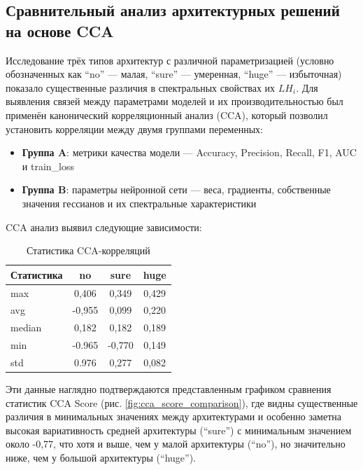 \documentclass[a4paper,12pt]{article}
\begin{document}
\subsection{Сравнительный анализ архитектурных решений на основе CCA}

Исследование трёх типов архитектур с различной параметризацией (условно обозначенных как ``no'' --- малая,
``sure'' --- умеренная, ``huge'' --- избыточная) показало существенные различия в спектральных свойствах их
$LH_i$. Для выявления связей между параметрами моделей и их производительностью был применён
канонический корреляционный анализ (CCA), который позволил установить корреляции между двумя группами переменных:

\begin{itemize}
  \item \textbf{Группа A}: метрики качества модели --- Accuracy, Precision, Recall, F1, AUC и train\_loss
  \item \textbf{Группа B}: параметры нейронной сети --- веса, градиенты, собственные значения гессианов и их
    спектральные характеристики
\end{itemize}

CCA анализ выявил следующие зависимости:

\begin{table}[ht]
  \centering
  \label{tab:cca_max}
  \begin{tabular}{|l|c|c|c|}
    \hline
    \textbf{Статистика} & \textbf{no} & \textbf{sure} & \textbf{huge} \\
    \hline
    max & 0,406 & 0,349 & 0,429 \\
    avg & -0,955 & 0,099 & 0,220 \\
    median & 0,182 & 0,182 & 0,189 \\
    min & -0.965 & -0,770 & 0,149 \\
    std & 0.976 & 0,277 & 0,082 \\
    \hline
  \end{tabular}
  \caption{Статистика CCA-корреляций}
\end{table}

Эти данные наглядно подтверждаются представленным графиком сравнения статистик CCA Score (рис.
\ref{fig:cca_score_comparison}), где видны существенные различия в минимальных значениях между архитектурами
и особенно заметна высокая вариативность средней архитектуры (``sure'') с минимальным значением около -0,77,
что хотя и выше, чем у малой архитектуры (``no''), но значительно ниже, чем у большой архитектуры (``huge'').
\end{document}
